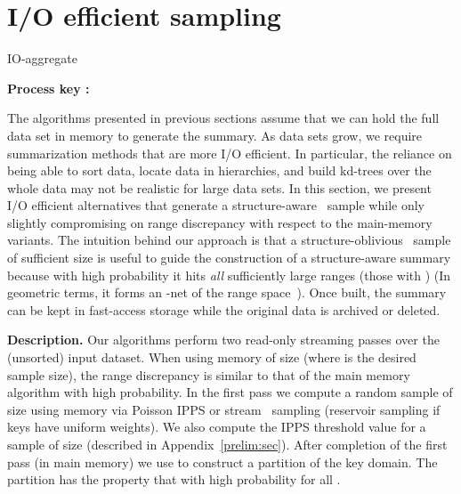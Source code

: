 \documentclass[11pt]{article}
\begin{document}
\section{I/O efficient sampling}
\label{IO:sec}

\begin{algorithm}[t]
\caption{{\sc IO-aggregate}}\label{io:alg}
{\bf Process key :}
\begin{algorithmic}[1]
\State 
\If {} 
 \State  {}
\Else \Comment{}
 \State  {}
 \If {} 
 \State  {}
 \Else {}
\State   
{}
  \State 
 \If {} 
  \State {}
 \EndIf
 \If {}
  \State {}
 \EndIf
 \If {} 
  \State {}
 \EndIf
 \If {}
  \State {}
 \EndIf
 \EndIf
 \EndIf
\end{algorithmic}
\end{algorithm}

The algorithms presented in previous sections
assume that we can hold the full data set in memory to generate the
summary. 
As data sets grow,
we require summarization methods that are more I/O efficient. 
In particular, the reliance on being able to sort data, locate data in
hierarchies, and build kd-trees over the whole data may not be realistic for large data
sets. 
In this section, 
we present I/O efficient alternatives that generate a structure-aware
\varopt\ sample
while only slightly compromising on range discrepancy with respect to the
main-memory variants. 
The intuition behind our approach is that a structure-oblivious
\varopt\ sample of sufficient size  
is useful to guide the construction of a structure-aware summary because with high probability it hits
{\em all} sufficiently large ranges (those with )
(In geometric terms, it forms an 
-net of the range space~\cite{epsilonnets:1987}).  
Once built, the summary can be kept in fast-access storage while the
original data is archived or deleted.

\medskip
\noindent
{\bf Description.}
Our algorithms perform two read-only streaming 
passes over the (unsorted) input dataset.
When using memory of size  (where  is the desired
sample size), the range discrepancy is similar to that of the main
memory algorithm with high probability.
In the first pass we compute a random sample  of size  using memory  via Poisson IPPS or stream
\varopt\ sampling (reservoir sampling if keys have uniform weights). 
We also compute the IPPS threshold value  for a sample of size 
(described in Appendix~\ref{prelim:sec}).
After completion of the first pass (in main memory) we use 
to construct a partition  of the key domain.  
The partition has the property that with high probability
 for all .
\end{document}
